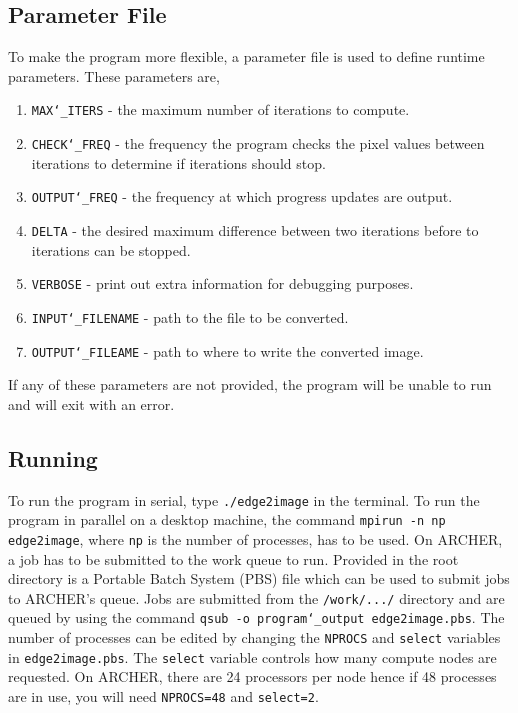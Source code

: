 \documentclass[11pt, a4paper]{article}
\begin{document}
		\subsection{Parameter File}
			To make the program more flexible, a parameter file is used to define runtime parameters. These parameters are,
				
				\begin{enumerate}
					\item \texttt{MAX\char`_ITERS} - the maximum number of iterations to compute.
					\item \texttt{CHECK\char`_FREQ} - the frequency the program checks the pixel values between iterations to determine if iterations should stop.
					\item \texttt{OUTPUT\char`_FREQ} - the frequency at which progress updates are output.
					\item \texttt{DELTA} - the desired maximum difference between two iterations before to iterations can be stopped.
					\item \texttt{VERBOSE} - print out extra information for debugging purposes.
					\item \texttt{INPUT\char`_FILENAME} - path to the file to be converted.
					\item \texttt{OUTPUT\char`_FILEAME} - path to where to write the converted image.
				\end{enumerate}
			
			\noindent If any of these parameters are not provided, the program will be unable to run and will exit with an error.
	
		\subsection{Running}
			To run the program in serial, type \texttt{./edge2image} in the terminal. To run the program in parallel on a desktop machine, the command \texttt{mpirun -n np edge2image}, where \texttt{np} is the number of processes, has to be used. On ARCHER, a job has to be submitted to the work queue to run. Provided in the root directory is a Portable Batch System (PBS) file which can be used to submit jobs to ARCHER's queue. Jobs are submitted from the \texttt{/work/.../} directory and are queued by using the command \texttt{qsub -o program\char`_output edge2image.pbs}.  The number of processes can be edited by changing the \texttt{NPROCS} and \texttt{select} variables in \texttt{edge2image.pbs}. The \texttt{select} variable controls how many compute nodes are requested. On ARCHER, there are 24 processors per node hence if 48 processes are in use, you will need \texttt{NPROCS=48} and \texttt{select=2}.
			
\end{document}
